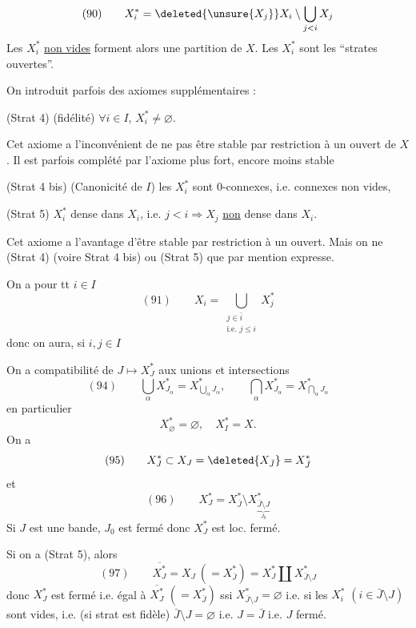 \[(90)\qquad X_i^*=\deleted{\unsure{X_j}}X_i\setminus\bigcup_{j<i}X_j\]
Les $X_i^*$ \uline{non vides} forment alors une partition de $X$. Les $X_i^*$ sont les ``strates ouvertes''.

On introduit parfois des axiomes supplémentaires :

(Strat 4) (fidélité) $\forall i\in I$, $X_i^*\neq\varnothing$.

Cet axiome a l'inconvénient de ne pas être stable par  restriction à un ouvert de $X$. Il est parfois complété par l'axiome plus fort, encore moins stable

(Strat 4 bis) (Canonicité de $I$) les $X_i^*$ sont $0$-connexes, i.e. connexes non vides,

(Strat 5)  $X_i^*$ dense dans $X_i$,  i.e. $j<i\Rightarrow X_j$ \uline{non} dense dans $X_i$.

Cet axiome a l'avantage d'être stable par restriction à un ouvert. Mais on ne  (Strat 4) (voire Strat 4 bis) ou (Strat 5) que par mention expresse.

On a pour tt $i\in I$
\[
(91)\qquad X_i=\bigcup_{\substack{j\in\bar i\\\text{i.e. }j\leq i}}X_j^*
\]
donc on aura, si $i,j\in I$

\deleted{\[X_J^*=X_{\bar J}\]}
On a compatibilité de $J\mapsto X_J^*$ aux unions et intersections
\[
(94)\qquad\bigcup_\alpha X_{J_\alpha}^*=X_{\bigcup_\alpha J_\alpha}^*,\qquad\bigcap_\alpha X_{J_\alpha}^*=X_{\bigcap_\alpha J_\alpha}^*
\]
en particulier
\[X_\varnothing^*=\varnothing,\quad X_I^*=X.\]
On a
\[(95)\qquad X_J^*\subset X_J=\deleted{X_{\bar J}}=X_{\bar J}^*\]
et
\[(96)\qquad X_J^*=X_{\bar J}^*\setminus X_{\underbrace{\bar J\setminus J}_{J_0}}^*\]
Si $J$ est une bande, $J_0$ est fermé donc $X_J^*$ est loc. fermé.

Si on a (Strat 5), alors
\[(97)\qquad\overline{X_J^*}=X_J\ (=X_{\bar J}^*)=X_J^*\amalg X_{\bar J\setminus J}^*\]
\deleted{\[\dot X_J\overset{\mathrm{déf}}=\overline{X_J^*}\setminus X_J^*\]}
donc  $X_J^*$ est fermé i.e. égal à $\overline{X_J^*}$ $(=X_{\bar J}^*)$ ssi $X_{\bar J\setminus J}^*=\varnothing$ i.e. si les $X_i^*$ $(i\in\bar J\setminus J)$ sont vides, i.e. (si strat est fidèle)  $\bar J\setminus J=\varnothing$ i.e. $J=\bar J$ i.e. $J$ fermé.

